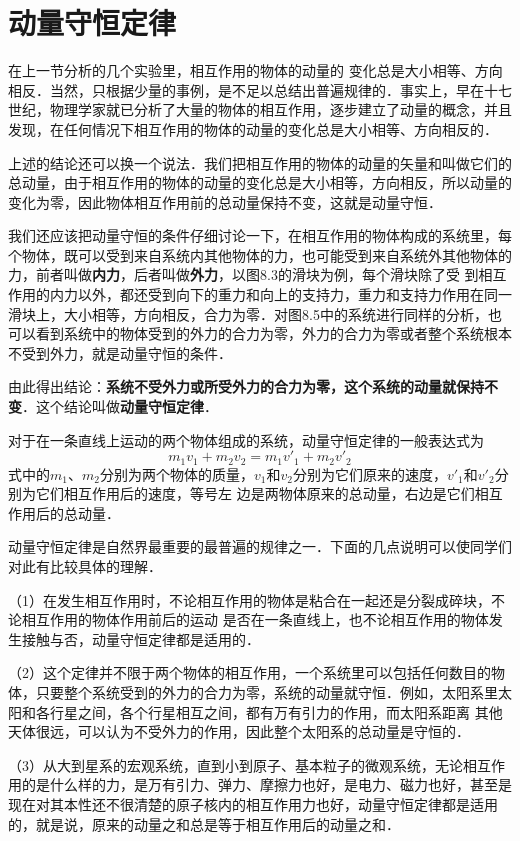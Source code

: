 \section{动量守恒定律}
在上一节分析的几个实验里，相互作用的物体的动量的
变化总是大小相等、方向相反．当然，只根据少量的事例，是不足以总结出普遍规律的．事实上，早在十七世纪，物理学家就已分析了大量的物体的相互作用，逐步建立了动量的概念，并且发现，在任何情况下相互作用的物体的动量的变化总是大小相等、方向相反的．

上述的结论还可以换一个说法．我们把相互作用的物体的动量的矢量和叫做它们的总动量，由于相互作用的物体的动量的变化总是大小相等，方向相反，所以动量的变化为零，因此物体相互作用前的总动量保持不变，这就是动量守恒．

我们还应该把动量守恒的条件仔细讨论一下，在相互作用的物体构成的系统里，每个物体，既可以受到来自系统内其他物体的力，也可能受到来自系统外其他物体的力，前者叫做\textbf{内力}，后者叫做\textbf{外力}，以图8.3的滑块为例，每个滑块除了受
到相互作用的内力以外，都还受到向下的重力和向上的支持力，重力和支持力作用在同一滑块上，大小相等，方向相反，合力为零．对图8.5中的系统进行同样的分析，也可以看到系统中的物体受到的外力的合力为零，外力的合力为零或者整个系统根本不受到外力，就是动量守恒的条件．

由此得出结论：\textbf{系统不受外力或所受外力的合力为零，这个系统的动量就保持不变}．这个结论叫做\textbf{动量守恒定律}．

对于在一条直线上运动的两个物体组成的系统，动量守恒定律的一般表达式为
\[m_1v_1+m_2v_2=m_1v'_1+m_2v'_2 \]
式中的$m_1$、$m_2$分别为两个物体的质量，$v_1$和$v_2$分别为它们原来的速度，$v'_1$和$v'_2$分别为它们相互作用后的速度，等号左
边是两物体原来的总动量，右边是它们相互作用后的总动量．

动量守恒定律是自然界最重要的最普遍的规律之一．下面的几点说明可以使同学们对此有比较具体的理解．

（1）在发生相互作用时，不论相互作用的物体是粘合在一起还是分裂成碎块，不论相互作用的物体作用前后的运动
是否在一条直线上，也不论相互作用的物体发生接触与否，动量守恒定律都是适用的．

（2）这个定律并不限于两个物体的相互作用，一个系统里可以包括任何数目的物体，只要整个系统受到的外力的合力为零，系统的动量就守恒．例如，太阳系里太阳和各行星之间，各个行星相互之间，都有万有引力的作用，而太阳系距离
其他天体很远，可以认为不受外力的作用，因此整个太阳系的总动量是守恒的．

（3）从大到星系的宏观系统，直到小到原子、基本粒子的微观系统，无论相互作用的是什么样的力，是万有引力、弹力、摩擦力也好，是电力、磁力也好，甚至是现在对其本性还不很清楚的原子核内的相互作用力也好，动量守恒定律都是适用的，就是说，原来的动量之和总是等于相互作用后的动量之和．

